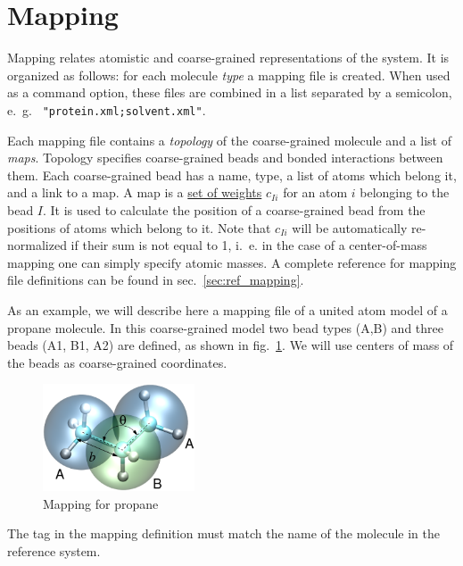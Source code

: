 \section{Mapping}
\label{sec:mapping}

Mapping relates atomistic and coarse-grained representations of the system. It is organized as follows: for each molecule {\em type} a mapping file is created. When used as a command option, these files are combined in a list separated by a semicolon, e.~g. ~\texttt{"protein.xml;solvent.xml"}.

Each mapping file contains a {\em topology} of the coarse-grained molecule and a list of {\em maps}. Topology specifies coarse-grained beads and bonded interactions between them. Each coarse-grained bead has a name, type, a list of atoms which belong it, and a link to a map. A map is a \hyperref[sec:mapping_operator]{set of weights} $c_{Ii}$ for an atom $i$ belonging to the bead $I$. It is used to calculate the position of a coarse-grained bead from the positions of atoms which belong to it. Note that $c_{Ii}$ will be automatically re-normalized if their sum is not equal to 1, i.~e. in the case of a center-of-mass mapping one can simply specify atomic masses. 
A complete reference for mapping file definitions can be found in sec.~\ref{sec:ref_mapping}.

As an example, we will describe here a mapping file of a united atom model of a propane molecule. In this coarse-grained model two bead types (A,B) and three beads (A1, B1, A2) are defined, as shown in fig.~\ref{fig:propane_map}. We will use centers of mass of the beads as  coarse-grained coordinates.


\begin{figure}[ht]
  \includegraphics[width=0.4\textwidth]{functionality/fig/propane.eps}
  \caption{Mapping for propane
  \label{fig:propane_map}
}
\end{figure}



The  tag in the mapping definition must match the name of the molecule in the reference system.

